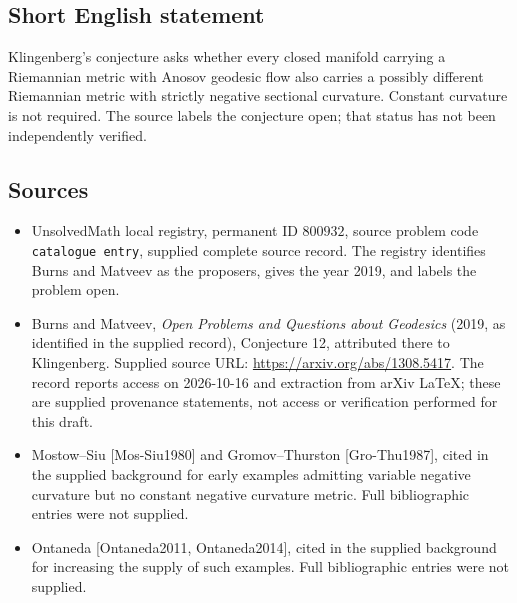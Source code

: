 \documentclass[11pt]{article}
\begin{document}
\subsection{Short English statement}
Klingenberg's conjecture asks whether every closed manifold carrying a Riemannian metric with Anosov geodesic flow also carries a possibly different Riemannian metric with strictly negative sectional curvature. Constant curvature is not required. The source labels the conjecture open; that status has not been independently verified.
\subsection{Sources}
\begin{itemize}
\item UnsolvedMath local registry, permanent ID \(800932\), source problem code \texttt{catalogue entry}, supplied complete source record. The registry identifies Burns and Matveev as the proposers, gives the year 2019, and labels the problem open.
\item Burns and Matveev, \emph{Open Problems and Questions about Geodesics} (2019, as identified in the supplied record), Conjecture 12, attributed there to Klingenberg. Supplied source URL: \url{https://arxiv.org/abs/1308.5417}. The record reports access on 2026-10-16 and extraction from arXiv LaTeX; these are supplied provenance statements, not access or verification performed for this draft.
\item Mostow--Siu [Mos-Siu1980] and Gromov--Thurston [Gro-Thu1987], cited in the supplied background for early examples admitting variable negative curvature but no constant negative curvature metric. Full bibliographic entries were not supplied.
\item Ontaneda [Ontaneda2011, Ontaneda2014], cited in the supplied background for increasing the supply of such examples. Full bibliographic entries were not supplied.
\end{itemize}
\end{document}
